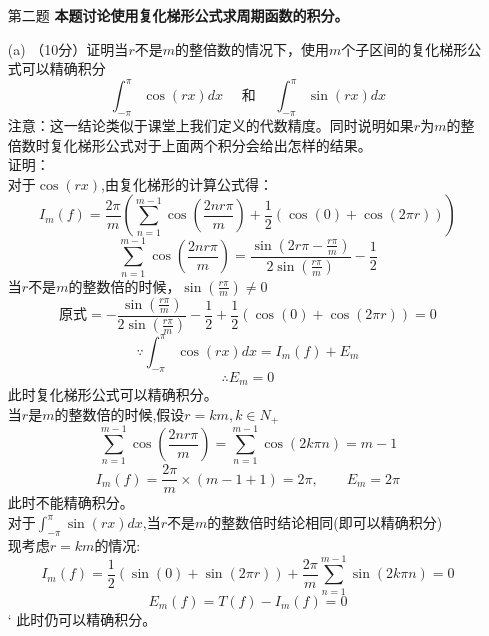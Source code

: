 \documentclass[12pt,a4paper,utf8]{ctexart}
\begin{document}
\begin{enumerate}
		\item[第二题] \textbf{本题讨论使用复化梯形公式求周期函数的积分。} 
		\item[(a)]（10分）证明当$r$不是$m$的整倍数的情况下，使用$m$个子区间的复化梯形公式可以精确积分
		$$\int_{-\pi}^{\pi} \cos (r x) d x \quad \text { 和 } \quad \int_{-\pi}^{\pi} \sin (r x) d x$$
		注意：这一结论类似于课堂上我们定义的代数精度。同时说明如果$r$为$m$的整倍数时复化梯形公式对于上面两个积分会给出怎样的结果。\\
		证明：\\
		对于$\cos(rx)$,由复化梯形的计算公式得：\\
		$$I_{m}(f)=\frac{2\pi}{m}(\sum_{n=1}^{m-1}\cos(\frac{2nr\pi}{m})+\frac{1}{2}(\cos(0)+\cos(2\pi r)))$$ $$
		\sum_{n=1}^{m-1}\cos(\frac{2nr\pi}{m})=\frac{\sin \left(2 r \pi-\frac{r \pi}{m}\right)}{2 \sin \left(\frac{r \pi}{m}\right)}-\frac{1}{2}$$
		当$r$不是$m$的整数倍的时候，$\sin(\frac{r\pi}{m})\neq 0$\\
		$$\text{原式}=-\frac{\sin \left(\frac{r \pi}{m}\right)}{2 \sin \left(\frac{r \pi}{m}\right)}-\frac{1}{2}+\frac{1}{2}(\cos(0)+\cos(2\pi r))=0$$
		$$\because \int_{-\pi}^{\pi} \cos (r x) d x=I_{m}(f)+E_{m}$$
		$$\therefore E_{m}=0$$此时复化梯形公式可以精确积分。\\
		当$r$是$m$的整数倍的时候,假设$r=km,k\in N_{+}$
		$$\sum_{n=1}^{m-1}\cos(\frac{2nr\pi}{m})=\sum_{n=1}^{m-1}\cos(2k\pi n)=m-1$$ $$
		I_{m}(f)=\frac{2\pi}{m}\times(m-1+1)=2\pi,\qquad E_{m}=2\pi$$此时不能精确积分。\\
		对于$\int_{-\pi}^{\pi} \sin (r x) d x$,当$r$不是$m$的整数倍时结论相同(即可以精确积分)\\
		现考虑$r=km$的情况:
		$$I_{m}(f)=\frac{1}{2}(\sin(0)+\sin(2\pi r))+\frac{2\pi}{m}\sum_{n=1}^{m-1}\sin(2k\pi n)=0$$ $$
		E_{m}(f)=T(f)-I_{m}(f)=0$$
	`	此时仍可以精确积分。		
		

\end{enumerate}
\end{document}
